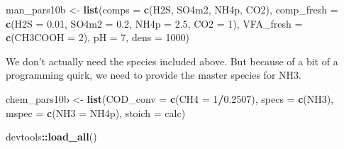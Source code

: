 \documentclass[
]{article}
\newenvironment{Shaded}{\begin{snugshade}}{\end{snugshade}}
\newcommand{\AttributeTok}[1]{\textcolor[rgb]{0.13,0.29,0.53}{#1}}
\newcommand{\DecValTok}[1]{\textcolor[rgb]{0.00,0.00,0.81}{#1}}
\newcommand{\FloatTok}[1]{\textcolor[rgb]{0.00,0.00,0.81}{#1}}
\newcommand{\FunctionTok}[1]{\textcolor[rgb]{0.13,0.29,0.53}{\textbf{#1}}}
\newcommand{\NormalTok}[1]{#1}
\newcommand{\OtherTok}[1]{\textcolor[rgb]{0.56,0.35,0.01}{#1}}
\newcommand{\SpecialCharTok}[1]{\textcolor[rgb]{0.81,0.36,0.00}{\textbf{#1}}}
\newcommand{\StringTok}[1]{\textcolor[rgb]{0.31,0.60,0.02}{#1}}
\begin{document}
\begin{Shaded}
\begin{Highlighting}[]
\NormalTok{man\_pars10b }\OtherTok{\textless{}{-}} \FunctionTok{list}\NormalTok{(}\AttributeTok{comps =} \FunctionTok{c}\NormalTok{(}\StringTok{\textquotesingle{}H2S\textquotesingle{}}\NormalTok{, }\StringTok{\textquotesingle{}SO4m2\textquotesingle{}}\NormalTok{, }\StringTok{\textquotesingle{}NH4p\textquotesingle{}}\NormalTok{, }\StringTok{\textquotesingle{}CO2\textquotesingle{}}\NormalTok{),}
                   \AttributeTok{comp\_fresh =} \FunctionTok{c}\NormalTok{(}\AttributeTok{H2S =} \FloatTok{0.01}\NormalTok{, }\AttributeTok{SO4m2 =} \FloatTok{0.2}\NormalTok{, }\AttributeTok{NH4p =} \FloatTok{2.5}\NormalTok{, }\AttributeTok{CO2 =} \DecValTok{1}\NormalTok{), }
                   \AttributeTok{VFA\_fresh =} \FunctionTok{c}\NormalTok{(}\AttributeTok{CH3COOH =} \DecValTok{2}\NormalTok{),}
                   \AttributeTok{pH =} \DecValTok{7}\NormalTok{, }\AttributeTok{dens =} \DecValTok{1000}\NormalTok{)}
\end{Highlighting}
\end{Shaded}

We don't actually need the species included above. But because of a bit
of a programming quirk, we need to provide the master species for NH3.

\begin{Shaded}
\begin{Highlighting}[]
\NormalTok{chem\_pars10b }\OtherTok{\textless{}{-}} \FunctionTok{list}\NormalTok{(}\AttributeTok{COD\_conv =} \FunctionTok{c}\NormalTok{(}\AttributeTok{CH4 =} \DecValTok{1}\SpecialCharTok{/}\FloatTok{0.2507}\NormalTok{),}
                    \AttributeTok{specs =} \FunctionTok{c}\NormalTok{(}\StringTok{\textquotesingle{}NH3\textquotesingle{}}\NormalTok{),}
                    \AttributeTok{mspec =} \FunctionTok{c}\NormalTok{(}\AttributeTok{NH3 =} \StringTok{\textquotesingle{}NH4p\textquotesingle{}}\NormalTok{),}
                    \AttributeTok{stoich =} \StringTok{\textquotesingle{}calc\textquotesingle{}}\NormalTok{)}
\end{Highlighting}
\end{Shaded}

\begin{Shaded}
\begin{Highlighting}[]
\NormalTok{devtools}\SpecialCharTok{::}\FunctionTok{load\_all}\NormalTok{()}
\end{Highlighting}
\end{Shaded}
\end{document}
